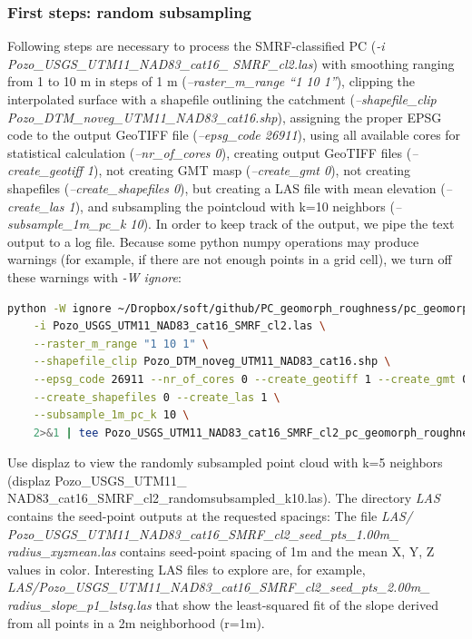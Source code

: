 \documentclass[a4paperpaper,,tablecaptionabove]{scrartcl}
\begin{document}
\hypertarget{first-steps-random-subsampling}{%
\subsubsection{First steps: random
subsampling}\label{first-steps-random-subsampling}}

Following steps are necessary to process the SMRF-classified PC
(\emph{-i Pozo\_USGS\_UTM11\_NAD83\_cat16\_ SMRF\_cl2.las}) with
smoothing ranging from 1 to 10 m in steps of 1 m
(\emph{--raster\_m\_range \enquote{1 10 1}}), clipping the interpolated
surface with a shapefile outlining the catchment
(\emph{--shapefile\_clip Pozo\_DTM\_noveg\_UTM11\_NAD83\_cat16.shp}),
assigning the proper EPSG code to the output GeoTIFF file
(\emph{--epsg\_code 26911}), using all available cores for statistical
calculation (\emph{--nr\_of\_cores 0}), creating output GeoTIFF files
(\emph{--create\_geotiff 1}), not creating GMT masp (\emph{--create\_gmt
0}), not creating shapefiles (\emph{--create\_shapefiles 0}), but
creating a LAS file with mean elevation (\emph{--create\_las 1}), and
subsampling the pointcloud with k=10 neighbors
(\emph{--subsample\_1m\_pc\_k 10}). In order to keep track of the
output, we pipe the text output to a log file. Because some python numpy
operations may produce warnings (for example, if there are not enough
points in a grid cell), we turn off these warnings with \emph{-W
ignore}:

\begin{lstlisting}[language=bash]
python -W ignore ~/Dropbox/soft/github/PC_geomorph_roughness/pc_geomorph_roughness.py \
    -i Pozo_USGS_UTM11_NAD83_cat16_SMRF_cl2.las \
    --raster_m_range "1 10 1" \
    --shapefile_clip Pozo_DTM_noveg_UTM11_NAD83_cat16.shp \
    --epsg_code 26911 --nr_of_cores 0 --create_geotiff 1 --create_gmt 0  \
    --create_shapefiles 0 --create_las 1 \
    --subsample_1m_pc_k 10 \
    2>&1 | tee Pozo_USGS_UTM11_NAD83_cat16_SMRF_cl2_pc_geomorph_roughness_subsample_k10_1_10_1.log
\end{lstlisting}

Use displaz to view the randomly subsampled point cloud with k=5
neighbors (displaz Pozo\_USGS\_UTM11\_
NAD83\_cat16\_SMRF\_cl2\_randomsubsampled\_k10.las). The directory
\emph{LAS} contains the seed-point outputs at the requested spacings:
The file \emph{LAS/
Pozo\_USGS\_UTM11\_NAD83\_cat16\_SMRF\_cl2\_seed\_pts\_1.00m\_
radius\_xyzmean.las} contains seed-point spacing of 1m and the mean X,
Y, Z values in color. Interesting LAS files to explore are, for example,
\emph{LAS/Pozo\_USGS\_UTM11\_NAD83\_cat16\_SMRF\_cl2\_seed\_pts\_2.00m\_
radius\_slope\_p1\_lstsq.las} that show the least-squared fit of the
slope derived from all points in a 2m neighborhood (r=1m).
\end{document}
